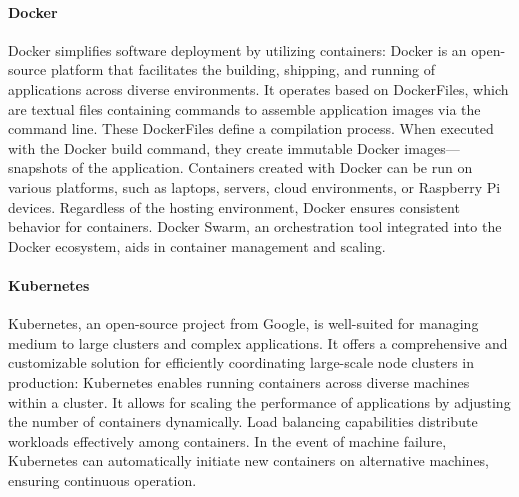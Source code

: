 \paragraph*{Docker}
Docker simplifies software deployment by utilizing containers:
Docker is an open-source platform that facilitates the building, shipping, and running of applications across diverse environments.
It operates based on DockerFiles, which are textual files containing commands to assemble application images via the command line.
These DockerFiles define a compilation process. 
When executed with the Docker build command, they create immutable Docker images—snapshots of the application.
Containers created with Docker can be run on various platforms, such as laptops, servers, cloud environments, or Raspberry Pi devices.
Regardless of the hosting environment, Docker ensures consistent behavior for containers.
Docker Swarm, an orchestration tool integrated into the Docker ecosystem, aids in container management and scaling.

\paragraph*{Kubernetes}
Kubernetes, an open-source project from Google, is well-suited for managing medium to large clusters and complex applications.
It offers a comprehensive and customizable solution for efficiently coordinating large-scale node clusters in production:
Kubernetes enables running containers across diverse machines within a cluster.
It allows for scaling the performance of applications by adjusting the number of containers dynamically.
Load balancing capabilities distribute workloads effectively among containers.
In the event of machine failure, Kubernetes can automatically initiate new containers on alternative machines, ensuring continuous operation.